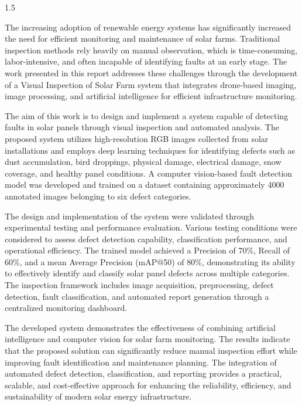\vspace{-1cm}


\begin{spacing}{1.5}

The increasing adoption of renewable energy systems has significantly increased the need for efficient monitoring and maintenance of solar farms. Traditional inspection methods rely heavily on manual observation, which is time-consuming, labor-intensive, and often incapable of identifying faults at an early stage. The work presented in this report addresses these challenges through the development of a Visual Inspection of Solar Farm system that integrates drone-based imaging, image processing, and artificial intelligence for efficient infrastructure monitoring.

The aim of this work is to design and implement a system capable of detecting faults in solar panels through visual inspection and automated analysis. The proposed system utilizes high-resolution RGB images collected from solar installations and employs deep learning techniques for identifying defects such as dust accumulation, bird droppings, physical damage, electrical damage, snow coverage, and healthy panel conditions. A computer vision-based fault detection model was developed and trained on a dataset containing approximately 4000 annotated images belonging to six defect categories. 

The design and implementation of the system were validated through experimental testing and performance evaluation. Various testing conditions were considered to assess defect detection capability, classification performance, and operational efficiency. The trained model achieved a Precision of 70\%, Recall of 60\%, and a mean Average Precision (mAP@50) of 80\%, demonstrating its ability to effectively identify and classify solar panel defects across multiple categories. The inspection framework includes image acquisition, preprocessing, defect detection, fault classification, and automated report generation through a centralized monitoring dashboard.

The developed system demonstrates the effectiveness of combining artificial intelligence and computer vision for solar farm monitoring. The results indicate that the proposed solution can significantly reduce manual inspection effort while improving fault identification and maintenance planning. The integration of automated defect detection, classification, and reporting provides a practical, scalable, and cost-effective approach for enhancing the reliability, efficiency, and sustainability of modern solar energy infrastructure.

\end{spacing}

\pagebreak
